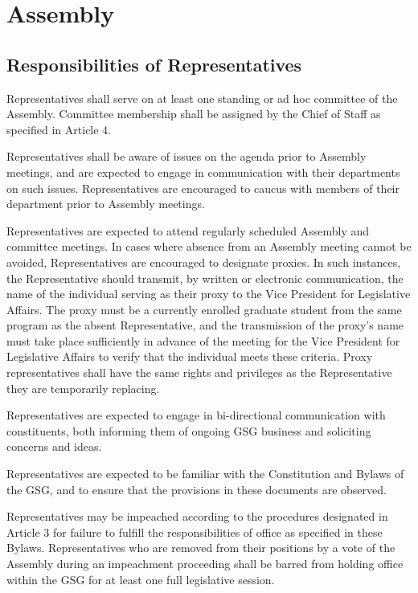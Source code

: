 \chapter{Assembly}
\section{Responsibilities of Representatives}
\begin{bylaws-number}
  \item Representatives shall serve on at least one standing or ad hoc committee of the Assembly. Committee membership shall be assigned by the Chief of Staff as specified in Article 4.
  \item Representatives shall be aware of issues on the agenda prior to Assembly meetings, and are expected to engage in communication with their departments on such issues. Representatives are encouraged to caucus with members of their department prior to Assembly meetings.
  \item Representatives are expected to attend regularly scheduled Assembly and committee meetings. In cases where absence from an Assembly meeting cannot be avoided, Representatives are encouraged to designate proxies. In such instances, the Representative should transmit, by written or electronic communication, the name of the individual serving as their proxy to the Vice President for Legislative Affairs. The proxy must be a currently enrolled graduate student from the same program as the absent Representative, and the transmission of the proxy’s name must take place sufficiently in advance of the meeting for the Vice President for Legislative Affairs to verify that the individual meets these criteria. Proxy representatives shall have the same rights and privileges as the Representative they are temporarily replacing.
  \item Representatives are expected to engage in bi-directional communication with constituents, both informing them of ongoing GSG business and soliciting concerns and ideas.
  \item Representatives are expected to be familiar with the Constitution and Bylaws of the GSG, and to ensure that the provisions in these documents are observed.
  \item Representatives may be impeached according to the procedures designated in Article 3 for failure to fulfill the responsibilities of office as specified in these Bylaws. Representatives who are removed from their positions by a vote of the Assembly during an impeachment proceeding shall be barred from holding office within the GSG for at least one full legislative session.

\end{bylaws-number}
